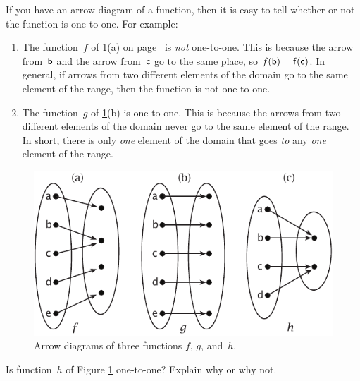 \begin{rem}
If you have an arrow diagram of a function, then it is easy to tell whether or not the function is one-to-one. For example:

\begin{enumerate}
\item The function~$f$ of \ref{arrow11}(a) on page~\pageref{arrow11} is \emph{not} one-to-one. This is because the arrow from~$\sf{b}$ and the arrow from~$\sf{c}$ go to the same place, so $f(\sf{b}) = f(\sf{c})$. In general, if arrows from two different elements of the domain go to the same element of the range, then the function is not one-to-one. 
\item The function~$g$ of \ref{arrow11}(b) is one-to-one. This is because the arrows from two different elements of the domain never go to the same element of the range.  In short, there is only \emph{one} element of the domain that goes \emph{to} any \emph{one} element of the range.  
\end{enumerate}
\end{rem}
\begin{figure}[h]
\includegraphics{images/arrow11.pdf}
\caption{Arrow diagrams of three functions $f$, $g$, and~$h$.}
\label{arrow11}
\end{figure}

\begin{exercise}{}
Is function~$h$ of Figure \ref{arrow11} one-to-one?  Explain why or why not.
\end{exercise}

